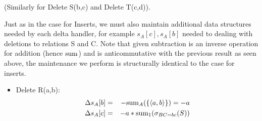 \begin{example}
(Similarly for Delete S(b,c) and Delete T(c,d)).

Just as in the case for Inserts, we must also maintain additional data
structures needed by each delta handler, for example $s_{A}[c], s_{A}[b]$ needed
to dealing with deletions to relations S and C. Note that given subtraction is an
inverse operation for addition (hence $\mathrm{sum}$) and is anticommutative with the
previous result as seen above, the maintenance we perform is
structurally identical to the case for inserts. 

\begin{itemize}
\item
Delete R(a,b):
\begin{eqnarray*}
\Delta s_{A}[b] &=& - \mathrm{sum}_{A}(\{{\langle a,b\rangle}\}) = -a\\
\Delta s_{A}[c] &=& -a * \mathrm{sum}_{1}(\sigma_{BC=bc}(S))
\end{eqnarray*}
\end{itemize}
\end{example}


